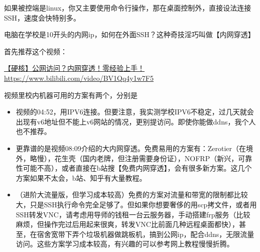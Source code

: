 如果被控端是linux，你又主要使用命令行操作，那在桌面控制外，直接设法连接SSH，速度会快特别多。

电脑在学校是10开头的内网ip，如何在外面SSH？这种奇技淫巧叫做【内网穿透】

首先推荐这个视频：

\href{https://www.bilibili.com/video/BV1Qq4y1w7F5}{【硬核】公网访问？内网穿透！零经验上手！}\url{https://www.bilibili.com/video/BV1Qq4y1w7F5}

视频里校内机器可用的方案有两个，分别是

\begin{itemize}
    \item 视频的04:52，用IPV6连接。但要注意，我实测学校IPV6不稳定，过几天就会出现有v6地址但不能上v6网站的情况，更别提访问。即使你能做ddns，我个人也不推荐。
    \item 更靠谱的是视频08:09介绍的大内网穿透。免费易用的方案有：Zerotier（在境外，略慢），花生壳（国内老牌，但注册需要身份证），NOFRP（新兴，可靠性可能不高），或者直接在b站搜【免费内网穿透】，会有很多新方案。这几个方案如果不太会，b站、知乎有大量教程。
    \item （进阶大流量版，但学习成本较高）免费的方案对流量和带宽的限制都比较大，只是SSH执行命令完全足够了。但如果你想要奢侈的用scp拷文件，或者用SSH转发VNC，请考虑用导师的钱租一台云服务器，手动搭建frp服务（比较麻烦，但操作完过后用起来很爽，转发VNC比前面几种远程桌面都快），甚至，在宿舍宽带下弄个垃圾机器做跳板机，搞到公网ip，配合ddns，无限流量访问。这些方案学习成本较高，有兴趣的可以参考网上教程慢慢折腾。
\end{itemize}

